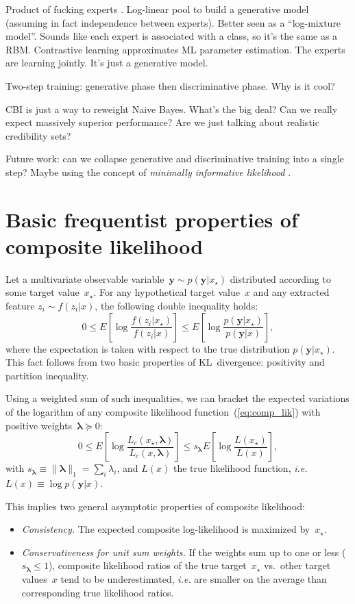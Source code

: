 \documentclass[english]{scrartcl}
\def\y{{\mathbf{y}}}
\newcommand{\blambda}{{\boldsymbol{\lambda}}}
\begin{document}
{\color{red}Product of fucking experts \cite{Hinton-02}. Log-linear pool to build a generative model (assuming in fact independence between experts). Better seen as a ``log-mixture model''. Sounds like each expert is associated with a class, so it's the same as a RBM. Contrastive learning approximates ML parameter estimation. The experts are learning jointly. It's just a generative model.}

{\color{red}Two-step training: generative phase then discriminative phase. Why is it cool?}

{\color{red}CBI is just a way to reweight Naive Bayes. What's the big deal? Can we really expect massively superior performance? Are we just talking about realistic credibility sets?}

Future work: can we collapse generative and discriminative training into a single step? Maybe using the concept of {\em minimally informative likelihood} \cite{Yuan-99b}.


\appendix


\section{Basic frequentist properties of composite likelihood}
\label{app:frequentist}

Let a multivariate observable variable~$\y \sim p(\y|x_\star)$ distributed according to some target value~$x_\star$. For any hypothetical target value~$x$ and any extracted feature $z_i\sim f(z_i|x)$, the following double inequality holds:
$$
0 \leq
E\left[
\log \frac{f(z_i|x_\star)}{f(z_i|x)}
\right]
\leq
E\left[
\log \frac{p(\y|x_\star)}{p(\y|x)}
\right],
$$
where the expectation is taken with respect to the true distribution $p(\y|x_\star)$. This fact follows from two basic properties of KL~divergence: positivity and partition inequality.

Using a weighted sum of such inequalities, we can bracket the expected variations of the logarithm of any composite likelihood function~(\ref{eq:comp_lik}) with positive weights~$\blambda\succeq 0$:
\begin{equation}
\label{eq:variation_bound}
0 \leq
E\left[ \log \frac{L_c(x_\star, \blambda)}{L_c(x,\blambda)} \right]
\leq 
s_\blambda E\left[ \log \frac{L(x_\star)}{L(x)} \right]
,
\end{equation}
with $s_\blambda\equiv \|\blambda\|_1 =\sum_i \lambda_i$, and $L(x)$ the true likelihood function, {\em i.e.} $L(x)\equiv \log p(\y|x)$.

This implies two general asymptotic properties of composite likelihood:
\begin{itemize}
\item {\em Consistency.} The expected composite log-likelihood is maximized by~$x_\star$.
\item {\em Conservativeness for unit sum weights.} If the weights sum up to one or less ($s_\blambda\leq 1$), composite likelihood ratios of the true target~$x_\star$ vs.~other target values~$x$ tend to be underestimated, {\em i.e.} are smaller on the average than corresponding true likelihood ratios.
\end{itemize}
\end{document}
